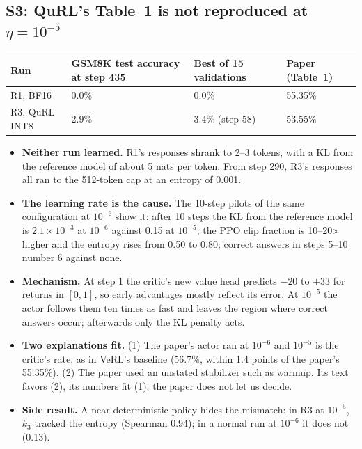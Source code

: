 \documentclass[11pt]{article}
\begin{document}
\subsection{S3: QuRL's Table~1 is not reproduced at \texorpdfstring{$\eta=10^{-5}$}{eta = 1e-5}}\label{sec:t1-results}
\begin{center}\small
\begin{tabular}{@{}llll@{}}
\toprule
Run & GSM8K test accuracy at step 435 & Best of 15 validations & Paper (Table~1)\\
\midrule
R1, BF16 & 0.0\% & 0.0\% & 55.35\%\\
R3, QuRL INT8 & 2.9\% & 3.4\% (step 58) & 53.55\%\\
\bottomrule
\end{tabular}
\end{center}
\begin{itemize}
\item \textbf{Neither run learned.} R1's responses shrank to 2--3 tokens, with a KL from the reference model of about 5 nats per token. From step 290, R3's responses all ran to the 512-token cap at an entropy of 0.001.
\item \textbf{The learning rate is the cause.} The 10-step pilots of the same configuration at $10^{-6}$ show it: after 10 steps the KL from the reference model is $2.1\times10^{-3}$ at $10^{-6}$ against 0.15 at $10^{-5}$; the PPO clip fraction is 10--20$\times$ higher and the entropy rises from 0.50 to 0.80; correct answers in steps 5--10 number 6 against none.
\item \textbf{Mechanism.} At step 1 the critic's new value head predicts $-20$ to $+33$ for returns in $[0,1]$, so early advantages mostly reflect its error. At $10^{-5}$ the actor follows them ten times as fast and leaves the region where correct answers occur; afterwards only the KL penalty acts.
\item \textbf{Two explanations fit.} (1) The paper's actor ran at $10^{-6}$ and $10^{-5}$ is the critic's rate, as in VeRL's baseline (56.7\%, within 1.4 points of the paper's 55.35\%). (2) The paper used an unstated stabilizer such as warmup. Its text favors (2), its numbers fit (1); the paper does not let us decide.
\item \textbf{Side result.} A near-deterministic policy hides the mismatch: in R3 at $10^{-5}$, $k_3$ tracked the entropy (Spearman 0.94); in a normal run at $10^{-6}$ it does not (0.13).
\end{itemize}
\end{document}
